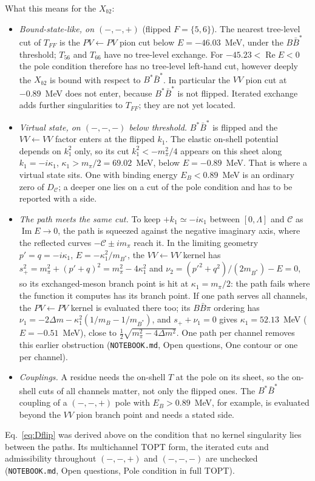 \documentclass[11pt]{article}
\newcommand{\file}[1]{\nolinkurl{#1}}
\begin{document}
What this means for the $X_{b2}$:
\begin{itemize}
\item \emph{Bound-state-like, on $(-,-,+)$} (flipped $F=\{5,6\}$). The nearest tree-level cut of $T_{FF}$ is the $PV\leftarrow PV$ pion cut below $E=-46.03$~MeV, under the $B\bar B^*$ threshold; $T_{56}$ and $T_{66}$ have no tree-level exchange. For $-45.23<\operatorname{Re}E<0$ the pole condition therefore has no tree-level left-hand cut, however deeply the $X_{b2}$ is bound with respect to $B^*\bar B^*$. In particular the $VV$ pion cut at $-0.89$~MeV does not enter, because $B^*\bar B^*$ is not flipped. Iterated exchange adds further singularities to $T_{FF}$; they are not yet located.
\item \emph{Virtual state, on $(-,-,-)$ below threshold.} $B^*\bar B^*$ is flipped and the $VV\leftarrow VV$ factor enters at the flipped $k_1$. The elastic on-shell potential depends on $k_1^2$ only, so its cut $k_1^2<-m_\pi^2/4$ appears on this sheet along $k_1=-i\kappa_1$, $\kappa_1>m_\pi/2=69.02$~MeV, below $E=-0.89$~MeV. That is where a virtual state sits. One with binding energy $E_B<0.89$~MeV is an ordinary zero of $D_{\mathcal C}$; a deeper one lies on a cut of the pole condition and has to be reported with a side.
\item \emph{The path meets the same cut.} To keep $+k_1\simeq-i\kappa_1$ between $[0,\Lambda]$ and $\mathcal C$ as $\operatorname{Im}E\to0$, the path is squeezed against the negative imaginary axis, where the reflected curves $-\mathcal C\pm im_\pi$ reach it. In the limiting geometry $p'=q=-i\kappa_1$, $E=-\kappa_1^2/m_{B^*}$, the $VV\leftarrow VV$ kernel has $s_+^2=m_\pi^2+(p'+q)^2=m_\pi^2-4\kappa_1^2$ and $\nu_2=(p'^2+q^2)/(2m_{B^*})-E=0$, so its exchanged-meson branch point is hit at $\kappa_1=m_\pi/2$: the path fails where the function it computes has its branch point. If one path serves all channels, the $PV\leftarrow PV$ kernel is evaluated there too; its $B\bar B\pi$ ordering has $\nu_1=-2\Delta m-\kappa_1^2(1/m_B-1/m_{B^*})$, and $s_++\nu_1=0$ gives $\kappa_1=52.13$~MeV ($E=-0.51$~MeV), close to $\frac12\sqrt{m_\pi^2-4\Delta m^2}$. One path per channel removes this earlier obstruction (\file{NOTEBOOK.md}, Open questions, One contour or one per channel).
\item \emph{Couplings.} A residue needs the on-shell $T$ at the pole on its sheet, so the on-shell cuts of all channels matter, not only the flipped ones. The $B^*\bar B^*$ coupling of a $(-,-,+)$ pole with $E_B>0.89$~MeV, for example, is evaluated beyond the $VV$ pion branch point and needs a stated side.
\end{itemize}
Eq.~\eqref{eq:Dflip} was derived above on the condition that no kernel singularity lies between the paths. Its multichannel TOPT form, the iterated cuts and admissibility throughout $(-,-,+)$ and $(-,-,-)$ are unchecked (\file{NOTEBOOK.md}, Open questions, Pole condition in full TOPT).
\end{document}

